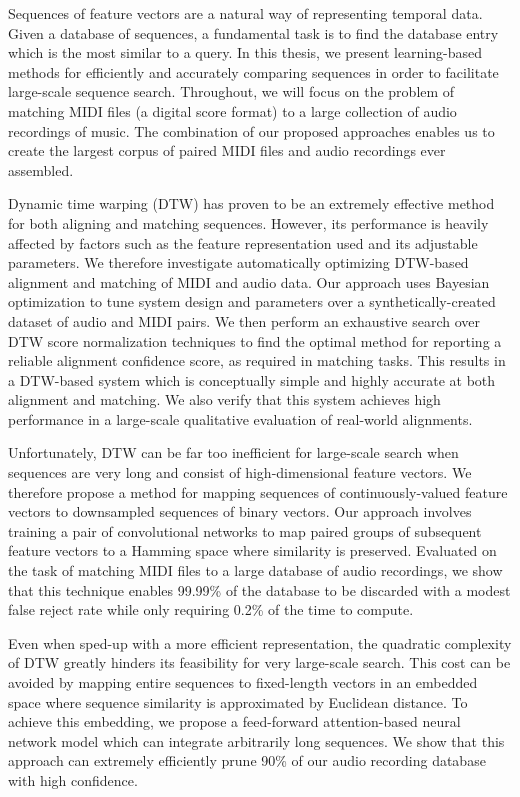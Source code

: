 Sequences of feature vectors are a natural way of representing temporal data.
Given a database of sequences, a fundamental task is to find the database entry which is the most similar to a query.
In this thesis, we present learning-based methods for efficiently and accurately comparing sequences in order to facilitate large-scale sequence search.
Throughout, we will focus on the problem of matching MIDI files (a digital score format) to a large collection of audio recordings of music.
The combination of our proposed approaches enables us to create the largest corpus of paired MIDI files and audio recordings ever assembled.

Dynamic time warping (DTW) has proven to be an extremely effective method for both aligning and matching sequences.
However, its performance is heavily affected by factors such as the feature representation used and its adjustable parameters.
We therefore investigate automatically optimizing DTW-based alignment and matching of MIDI and audio data.
Our approach uses Bayesian optimization to tune system design and parameters over a synthetically-created dataset of audio and MIDI pairs.
We then perform an exhaustive search over DTW score normalization techniques to find the optimal method for reporting a reliable alignment confidence score, as required in matching tasks.
This results in a DTW-based system which is conceptually simple and highly accurate at both alignment and matching.
We also verify that this system achieves high performance in a large-scale qualitative evaluation of real-world alignments.

Unfortunately, DTW can be far too inefficient for large-scale search when sequences are very long and consist of high-dimensional feature vectors.
We therefore propose a method for mapping sequences of continuously-valued feature vectors to downsampled sequences of binary vectors.
Our approach involves training a pair of convolutional networks to map paired groups of subsequent feature vectors to a Hamming space where similarity is preserved.
Evaluated on the task of matching MIDI files to a large database of audio recordings, we show that this technique enables 99.99\% of the database to be discarded with a modest false reject rate while only requiring 0.2\% of the time to compute.

Even when sped-up with a more efficient representation, the quadratic complexity of DTW greatly hinders its feasibility for very large-scale search.
This cost can be avoided by mapping entire sequences to fixed-length vectors in an embedded space where sequence similarity is approximated by Euclidean distance.
To achieve this embedding, we propose a feed-forward attention-based neural network model which can integrate arbitrarily long sequences.
We show that this approach can extremely efficiently prune 90\% of our audio recording database with high confidence.

